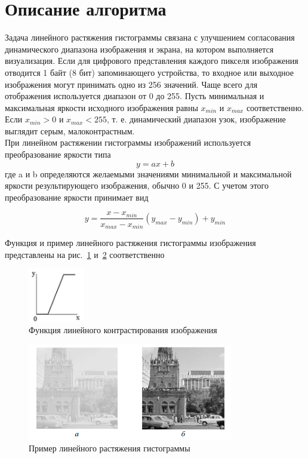 \section*{Описание алгоритма}

Задача линейного растяжения гистограммы связана с улучшением согласования динамического диапазона изображения и экрана, на котором выполняется визуализация. Если для цифрового представления каждого пикселя изображения отводится 1 байт (8 бит) запоминающего устройства, то входное или выходное изображения могут принимать одно из 256 значений. Чаще всего для отображения используется диапазон от 0 до 255. Пусть минимальная и максимальная яркости исходного изображения равны $x_{min}$ и $x_{max}$ соответственно. Если $x_{min} > 0$ и $x_{max} < 255$, т. е. динамический диапазон узок, изображение выглядит серым, малоконтрастным.\\

При линейном растяжении гистограммы изображений используется преобразование яркости типа 
\begin{equation}\label{formula}
y = ax + b
\end{equation}
где a и b определяются желаемыми значениями минимальной и максимальной яркости результирующего изображения, обычно 0 и 255. С учетом этого преобразование яркости принимает вид 

\begin{equation}\label{formulaLinStreach}
y = \frac{x - x_{min}}{x_{max} - x_{min}}(y_{max} - y_{min}) + y_{min}
\end{equation}

Функция и пример линейного растяжения гистограммы изображения представлены на рис.~\ref{fig:funcLinStreach} и~\ref{fig:exampleLinStreach} соответственно

\begin{figure}[h!]
\centering
\includegraphics[width=0.22\textwidth]{images/funcLinStreach.png}
\caption{Функция линейного контрастирования изображения}
\label{fig:funcLinStreach}
\end{figure}

\begin{figure}[h!]
\centering
\includegraphics[width=0.8\textwidth]{images/linStreachExample.png}
\caption{ Пример линейного растяжения гистограммы}
\label{fig:exampleLinStreach}
\end{figure}
